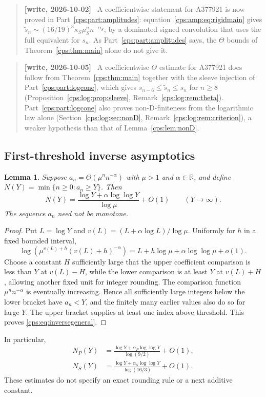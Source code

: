 \documentclass[11pt,letterpaper]{article}
\numberwithin{equation}{section}
\newtheorem{lemma}[theorem]{Lemma}
\theoremstyle{remark}\newtheorem{remark}[theorem]{Remark}
\newcommand{\RR}{\mathbb R}
\newenvironment{writenote}{\begin{quote}\small\sloppy\textbf{[write, 2026-10-02]}\ }{\end{quote}}
\newenvironment{writenotelog}{\begin{quote}\small\sloppy\textbf{[write, 2026-10-05]}\ }{\end{quote}}
\begin{document}
\begin{writenote}
A coefficientwise statement for A377921 is now proved in Part~\ref{cps:part:amplitudes}:
equation~\eqref{cps:amp:eq:rigidmain} gives
$\widetilde s_n\sim(16/19)^3\kappa_S\mu_S^nn^{-\alpha_S}$, by a dominated signed convolution that
uses the full equivalent for $s_n$. As Part~\ref{cps:part:amplitudes} says, the $\Theta$ bounds
of Theorem~\ref{cps:thm:main} alone do not give it.
\end{writenote}

\begin{writenotelog}
A coefficientwise $\Theta$ estimate for A377921 does follow from Theorem~\ref{cps:thm:main}
together with the sleeve injection of Part~\ref{cps:part:logcone}, which gives
$s_{n-6}\le\widetilde s_n\le s_n$ for $n\ge8$ (Proposition~\ref{cps:log:prop:sleeve},
Remark~\ref{cps:log:rem:theta}). Part~\ref{cps:part:logcone} also proves non-D-finiteness from
the logarithmic law alone (Section~\ref{cps:log:sec:nonD}, Remark~\ref{cps:log:rem:criterion}), a
weaker hypothesis than that of Lemma~\ref{cps:lem:nonD}.
\end{writenotelog}

\subsection{First-threshold inverse asymptotics}
\begin{lemma}\label{cps:lem:inverse}
Suppose $a_n=\Theta(\mu^n n^{-\alpha})$ with $\mu>1$ and $\alpha\in\RR$, and define
$N(Y)=\min\{n\ge0:a_n\ge Y\}$. Then
\begin{equation}\label{cps:eq:inversegeneral}
 N(Y)=\frac{\log Y+\alpha\log\log Y}{\log\mu}+O(1)
 \qquad(Y\to\infty).
\end{equation}
The sequence $a_n$ need not be monotone.
\end{lemma}
\begin{proof}
Put $L=\log Y$ and $v(L)=(L+\alpha\log L)/\log\mu$. Uniformly for $h$ in a fixed bounded interval,
\begin{equation}
 \log\!\left(\mu^{v(L)+h}(v(L)+h)^{-\alpha}\right)
 =L+h\log\mu+\alpha\log\log\mu+o(1).
\end{equation}
Choose a constant $H$ sufficiently large that the upper coefficient comparison is less than $Y$ at $v(L)-H$, while the lower comparison is at least $Y$ at $v(L)+H$, allowing another fixed unit for integer rounding. The comparison function $\mu^n n^{-\alpha}$ is eventually increasing. Hence all sufficiently large integers below the lower bracket have $a_n<Y$, and the finitely many earlier values also do so for large $Y$. The upper bracket supplies at least one index above threshold. This proves \eqref{cps:eq:inversegeneral}.
\end{proof}
In particular,
\begin{align}
 N_P(Y)&=\frac{\log Y+\alpha_P\log\log Y}{\log(9/2)}+O(1),\label{cps:eq:Pinverse}\\
 N_S(Y)&=\frac{\log Y+\alpha_S\log\log Y}{\log(16/3)}+O(1).\label{cps:eq:Sinverse}
\end{align}
These estimates do not specify an exact rounding rule or a next additive constant.
\end{document}
